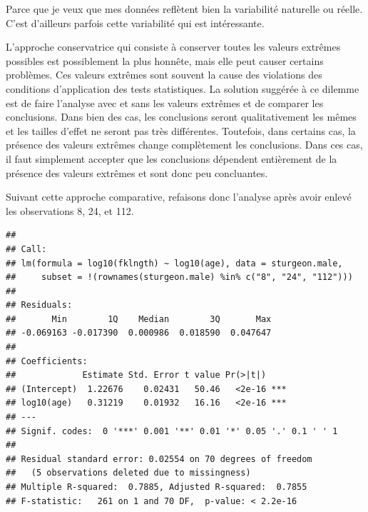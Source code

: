 \documentclass[12pt,]{book}
\newenvironment{Shaded}{\begin{snugshade}}{\end{snugshade}}
\newcommand{\DataTypeTok}[1]{\textcolor[rgb]{0.13,0.29,0.53}{#1}}
\newcommand{\FloatTok}[1]{\textcolor[rgb]{0.00,0.00,0.81}{#1}}
\newcommand{\KeywordTok}[1]{\textcolor[rgb]{0.13,0.29,0.53}{\textbf{#1}}}
\newcommand{\NormalTok}[1]{#1}
\newcommand{\OperatorTok}[1]{\textcolor[rgb]{0.81,0.36,0.00}{\textbf{#1}}}
\newcommand{\StringTok}[1]{\textcolor[rgb]{0.31,0.60,0.02}{#1}}
\begin{document}
Parce que je veux que mes données reflètent bien la variabilité naturelle ou réelle. C'est d'ailleurs parfois cette variabilité qui est intéressante.

L'approche conservatrice qui consiste à conserver toutes les valeurs extrêmes possibles est possiblement la plus honnête, mais elle peut causer certains problèmes. Ces valeurs extrêmes sont souvent la cause des violations des conditions d'application des tests statistiques. La solution suggérée à ce dilemme est de faire l'analyse avec et sans les valeurs extrêmes et de comparer les conclusions. Dans bien des cas, les conclusions seront qualitativement les mêmes et les tailles d'effet ne seront pas très différentes. Toutefois, dans certains cas, la présence des valeurs extrêmes change complètement les conclusions. Dans ces cas, il faut simplement accepter que les conclusions dépendent entièrement de la présence des valeurs extrêmes et sont donc peu concluantes.

Suivant cette approche comparative, refaisons donc l'analyse après
avoir enlevé les observations 8, 24, et 112.

\begin{Shaded}
\end{Shaded}

\begin{verbatim}
## 
## Call:
## lm(formula = log10(fklngth) ~ log10(age), data = sturgeon.male, 
##     subset = !(rownames(sturgeon.male) %in% c("8", "24", "112")))
## 
## Residuals:
##       Min        1Q    Median        3Q       Max 
## -0.069163 -0.017390  0.000986  0.018590  0.047647 
## 
## Coefficients:
##             Estimate Std. Error t value Pr(>|t|)    
## (Intercept)  1.22676    0.02431   50.46   <2e-16 ***
## log10(age)   0.31219    0.01932   16.16   <2e-16 ***
## ---
## Signif. codes:  0 '***' 0.001 '**' 0.01 '*' 0.05 '.' 0.1 ' ' 1
## 
## Residual standard error: 0.02554 on 70 degrees of freedom
##   (5 observations deleted due to missingness)
## Multiple R-squared:  0.7885, Adjusted R-squared:  0.7855 
## F-statistic:   261 on 1 and 70 DF,  p-value: < 2.2e-16
\end{verbatim}
\end{document}
